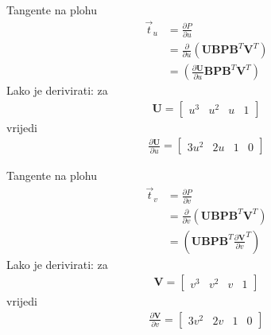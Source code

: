 \documentclass[9pt]{beamer}
\begin{document}
\begin{frame}{Tangente na plohu}
	\begin{align*}
	\vec{t}_u &= \frac{\partial P}{\partial u} \\
	&= \frac{\partial}{\partial u}\left( \mathbf{U}\mathbf{B}\mathbf{P}\mathbf{B}^T\mathbf{V}^T\right) \\
	&= \left(\frac{\partial \mathbf{U}}{\partial u} \mathbf{B}\mathbf{P}\mathbf{B}^T\mathbf{V}^T\right)
	\end{align*}
	Lako je derivirati: za 
	\begin{align*}
	\mathbf{U} = \begin{bmatrix}
	u^3 & u^2  & u& 1 
	\end{bmatrix}
	\end{align*}
	vrijedi
	\begin{align*}
	\frac{\partial \mathbf{U}}{\partial u} = \begin{bmatrix}
	3u^2 & 2u  & 1 & 0 
	\end{bmatrix}
	\end{align*}
\end{frame}

\begin{frame}{Tangente na plohu}
	\begin{align*}
	\vec{t}_v &= \frac{\partial P}{\partial v} \\
	&= \frac{\partial}{\partial v}\left( \mathbf{U}\mathbf{B}\mathbf{P}\mathbf{B}^T\mathbf{V}^T\right) \\
	&= \left(\mathbf{U}\mathbf{B}\mathbf{P}\mathbf{B}^T{\frac{\partial \mathbf{V}}{\partial v}}^T\right)
	\end{align*}
	Lako je derivirati: za 
	\begin{align*}
	\mathbf{V} = \begin{bmatrix}
	v^3 & v^2  & v& 1 
	\end{bmatrix}
	\end{align*}
	vrijedi
	\begin{align*}
	\frac{\partial \mathbf{V}}{\partial v} = \begin{bmatrix}
	3v^2 & 2v  & 1 & 0 
	\end{bmatrix}
	\end{align*}
\end{frame}
\end{document}
